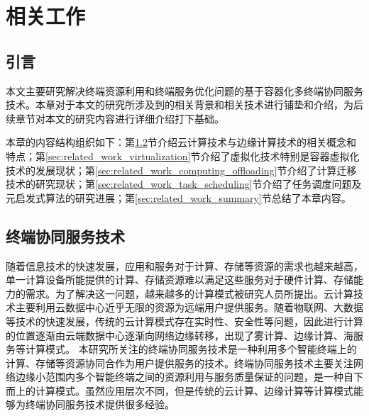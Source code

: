 \chapter{相关工作 }\label{chap:related_work}

\section{引言}
本文主要研究解决终端资源利用和终端服务优化问题的基于容器化多终端协同服务技术。本章对于本文的研究所涉及到的相关背景和相关技术进行铺垫和介绍，为后续章节对本文的研究内容进行详细介绍打下基础。

本章的内容结构组织如下：第\ref{sec:related_work_cloud_computing}节介绍云计算技术与边缘计算技术的相关概念和特点；第\ref{sec:related_work_virtualization}节介绍了虚拟化技术特别是容器虚拟化技术的发展现状；第\ref{sec:related_work_computing_offloading}节介绍了计算迁移技术的研究现状；第\ref{sec:related_work_task_scheduling}节介绍了任务调度问题及元启发式算法的研究进展；第\ref{sec:related_work_summary}节总结了本章内容。

\section{终端协同服务技术}\label{sec:related_work_cloud_computing}
随着信息技术的快速发展，应用和服务对于计算、存储等资源的需求也越来越高，单一计算设备所能提供的计算、存储资源难以满足这些服务对于硬件计算、存储能力的需求。为了解决这一问题，越来越多的计算模式被研究人员所提出。云计算技术主要利用云数据中心近乎无限的资源为远端用户提供服务。随着物联网、大数据等技术的快速发展，传统的云计算模式存在实时性、安全性等问题，因此进行计算的位置逐渐由云端数据中心逐渐向网络边缘转移，出现了雾计算、边缘计算、海服务等计算模式。
本研究所关注的终端协同服务技术是一种利用多个智能终端上的计算、存储等资源协同合作为用户提供服务的技术。终端协同服务技术主要关注网络边缘小范围内多个智能终端之间的资源利用与服务质量保证的问题，是一种自下而上的计算模式。虽然应用层次不同，但是传统的云计算、边缘计算等计算模式能够为终端协同服务技术提供很多经验。

